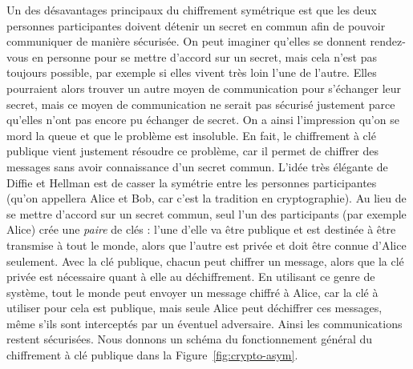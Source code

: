 Un des désavantages principaux du chiffrement symétrique est que les deux
personnes participantes doivent détenir un secret en commun afin de pouvoir
communiquer de manière sécurisée. On peut imaginer qu'elles se donnent
rendez-vous en personne pour se mettre d'accord sur un secret, mais cela n'est
pas toujours possible, par exemple si elles vivent très loin l'une de l'autre.
Elles pourraient alors trouver un autre moyen de communication pour s'échanger
leur secret, mais ce moyen de communication ne serait pas sécurisé justement
parce qu'elles n'ont pas encore pu échanger de secret. On a ainsi l'impression
qu'on se mord la queue et que le problème est insoluble. En fait, le chiffrement
à clé publique vient justement résoudre ce problème, car il permet de chiffrer
des messages sans avoir connaissance d'un secret commun. L'idée très élégante de
Diffie et Hellman est de casser la symétrie entre les personnes participantes
(qu'on appellera Alice et Bob, car c'est la tradition en cryptographie).
Au lieu de se mettre d'accord sur un secret commun, seul l'un des participants
(par exemple Alice) crée une \emph{paire} de clés : l'une d'elle va être
publique et est destinée à être transmise à tout le monde, alors que l'autre est
privée et doit être connue d'Alice seulement. Avec la clé publique, chacun peut
chiffrer un message, alors que la clé privée est nécessaire quant à elle au
déchiffrement. En utilisant ce genre de système, tout le monde peut envoyer un
message chiffré à Alice, car la clé à utiliser pour cela est publique, mais
seule Alice peut déchiffrer ces messages, même s'ils sont interceptés par un
éventuel adversaire. Ainsi les communications restent sécurisées. Nous donnons un
schéma du fonctionnement général du chiffrement à clé publique dans la
Figure~\ref{fig:crypto-asym}.
